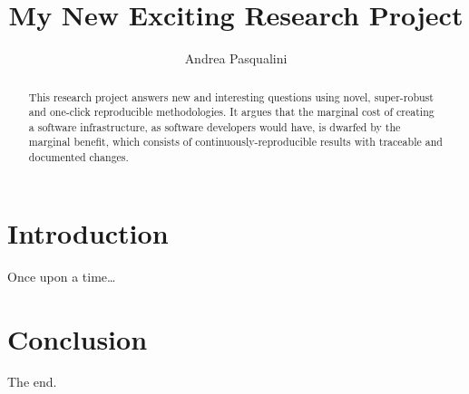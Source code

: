 \documentclass[a4paper,12pt]{article}
\author{Andrea Pasqualini}
\title{My New Exciting Research Project}
\date{}
\begin{document}
  \maketitle

  \begin{abstract}
    This research project answers new and interesting questions using novel, super-robust and one-click reproducible methodologies.
    It argues that the marginal cost of creating a software infrastructure, as software developers would have, is dwarfed by the marginal benefit, which consists of continuously-reproducible results with traceable and documented changes.
  \end{abstract}

  \section{Introduction}

    Once upon a time\dots


  \section{Conclusion}

    The end.
\end{document}
